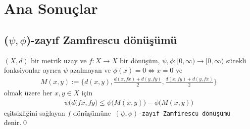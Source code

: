 \documentclass[8pt]{beamer}
\begin{document}
\section{Ana Sonu\c{c}lar}
\subsection{($\psi,\phi$)-zay\i f Zamfirescu d\"{o}n\"{u}\c{s}\"{u}m\"{u}}
\begin{frame}
  \begin{definition}
    $(X,d)$  bir metrik uzay ve $f: X \rightarrow X$ bir d\"{o}n\"{u}\c{s}\"{u}m, $\psi,\phi : [0,\infty)\to [0,\infty)$ s\"urekli fonksiyonlar ayr\i ca $\psi$ azalmayan ve $\phi(x)=0 \iff x=0$ ve
    \begin{align}
M(x,y):=\bigg\{ d(x,y), \frac{d(x,fx)+d(y,fy)}{2}, \frac{d(x,fy)+d(y,fx)}{2} \bigg\}
    \end{align}
olmak \"{u}zere her $x,y \in X$ i\c{c}in
\begin{align}
\psi\big(d(fx,fy\big)\leq \psi\big(M(x,y)\big)-\phi\big(M(x,y)\big)
\end{align}
e\c{s}itsizli\u{g}ini sa\u{g}layan $f$ d\"{o}n\"{u}\c{s}\"{u}m\"une\texttt{ $(\psi,\phi)$-zay\i f Zamfirescu d\"{o}n\"{u}\c{s}\"{u}m\"{u}} denir.\qed 
  \end{definition}
\end{frame}%
\end{document}
